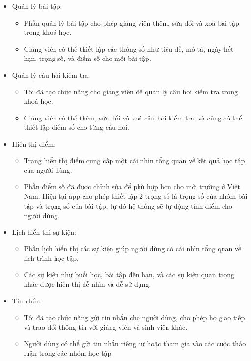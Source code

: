 \documentclass[../Thesis.tex]{subfiles}
\begin{document}
\begin{itemize}
        \item Quản lý bài tập:
            \begin{itemize}
                \item Phần quản lý bài tập cho phép giảng viên thêm, sửa đổi và xoá bài tập trong khoá học.
                \item Giảng viên có thể thiết lập các thông số như tiêu đề, mô tả, ngày hết hạn, trọng số, và điểm số cho mỗi bài tập.
            \end{itemize}
        \item Quản lý câu hỏi kiểm tra:
            \begin{itemize}
                \item Tôi đã tạo chức năng cho giảng viên để quản lý câu hỏi kiểm tra trong khoá học.
                \item Giảng viên có thể thêm, sửa đổi và xoá câu hỏi kiểm tra, và cũng có thể thiết lập điểm số cho từng câu hỏi.
            \end{itemize}
        \item Hiển thị điểm:
            \begin{itemize}
                \item Trang hiển thị điểm cung cấp một cái nhìn tổng quan về kết quả học tập của người dùng.
                \item Phần điểm số đã được chỉnh sửa để phù hợp hơn cho môi trường ở Việt Nam. Hiện tại app cho phép thiết lập 2 trọng số là trọng số của nhóm bài tập và trọng số của bài tập, tự đó hệ thống sẽ tự động tính điểm cho người dùng.
            \end{itemize}
        \item Lịch hiển thị sự kiện:
            \begin{itemize}
                \item Phần lịch hiển thị các sự kiện giúp người dùng có cái nhìn tổng quan về lịch trình học tập.
                \item Các sự kiện như buổi học, bài tập đến hạn, và các sự kiện quan trọng khác được hiển thị dễ nhìn và dễ sử dụng.
            \end{itemize}
        \item Tin nhắn:
            \begin{itemize}
                \item Tôi đã tạo chức năng gửi tin nhắn cho người dùng, cho phép họ giao tiếp và trao đổi thông tin với giảng viên và sinh viên khác.
                \item Người dùng có thể gửi tin nhắn riêng tư hoặc tham gia vào các cuộc thảo luận trong các nhóm học tập.

\end{itemize}
\end{itemize}
\end{document}
